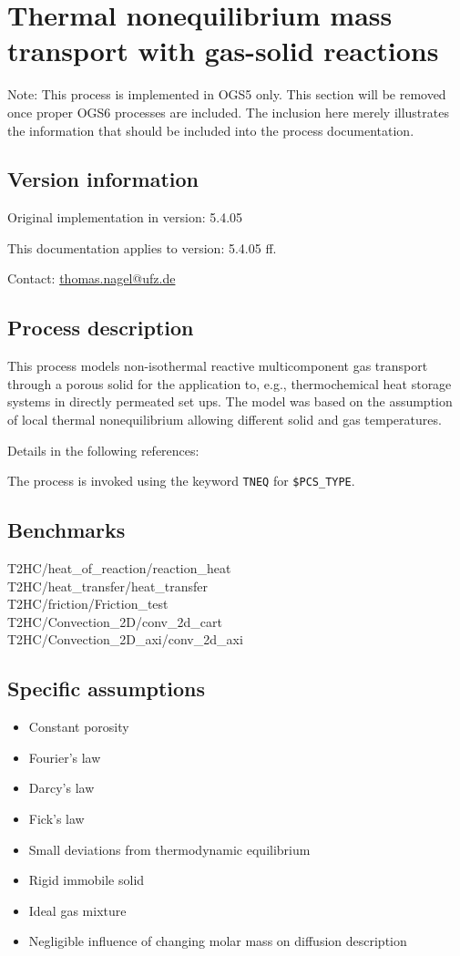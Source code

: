 \section{Thermal nonequilibrium mass transport with gas-solid reactions}
Note: This process is implemented in OGS5 only. This section will be removed once proper OGS6 processes are included. The inclusion here merely illustrates the information that should be included into the process documentation.

\subsection{Version information}
Original implementation in version: 5.4.05

This documentation applies to version: 5.4.05 ff.

Contact: \url{thomas.nagel@ufz.de}

\subsection{Process description}
This process models non-isothermal reactive multicomponent gas transport through a porous solid for the application to, e.g., thermochemical heat storage systems in directly permeated set ups. The model was based on the assumption of local thermal nonequilibrium allowing different solid and gas temperatures.

Details in the following references: \cite{Nagel2013,Shao2013}

The process is invoked using the keyword \texttt{TNEQ} for \texttt{\$PCS\_TYPE}.

\subsection{Benchmarks}
T2HC/heat\_of\_reaction/reaction\_heat\\
T2HC/heat\_transfer/heat\_transfer\\
T2HC/friction/Friction\_test\\
T2HC/Convection\_2D/conv\_2d\_cart\\
T2HC/Convection\_2D\_axi/conv\_2d\_axi

\subsection{Specific assumptions}
\begin{itemize}
	\item Constant porosity
	\item Fourier's law
	\item Darcy's law
	\item Fick's law
	\item Small deviations from thermodynamic equilibrium
	\item Rigid immobile solid
	\item Ideal gas mixture
	\item Negligible influence of changing molar mass on diffusion description
\end{itemize}

